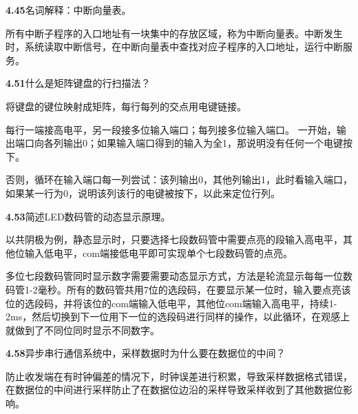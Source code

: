\documentclass{article}
\begin{document}
    \noindent\textbf{4.45}名词解释：中断向量表。\par
    所有中断子程序的入口地址有一块集中的存放区域，称为中断向量表。中断发生时，系统读取中断信号，在中断向量表中查找对应子程序的入口地址，运行中断服务。
    \\[4pt]\par

    \noindent\textbf{4.51}什么是矩阵键盘的行扫描法？\par
    将键盘的键位映射成矩阵，每行每列的交点用电键链接。\par
    每行一端接高电平，另一段接多位输入端口；每列接多位输入端口。
一开始，输出端口向各列输出0；如果输入端口得到的输入为全1，那说明没有任何一个电键按下。\par
    否则，循环在输入端口每一列尝试：该列输出0，其他列输出1，此时看输入端口，如果某一行为0，说明该列该行的电键被按下，以此来定位行列。
    \\[4pt]\par

    \noindent\textbf{4.53}简述LED数码管的动态显示原理。\par
    以共阴极为例，静态显示时，只要选择七段数码管中需要点亮的段输入高电平，其他位输入低电平，com端接低电平即可实现单个七段数码管的点亮。\par
多位七段数码管同时显示数字需要需要动态显示方式，方法是轮流显示每每一位数码管1-2毫秒。所有的数码管共用7位的选段码，在要显示某一位时，输入要点亮该位的选段码，并将该位的com端输入低电平，其他位com端输入高电平，持续1-2ms，然后切换到下一位用下一位的选段码进行同样的操作，以此循环，在观感上就做到了不同位同时显示不同数字。
    \\[4pt]\par

    \noindent\textbf{4.58}异步串行通信系统中，采样数据时为什么要在数据位的中间？\par
    防止收发端在有时钟偏差的情况下，时钟误差进行积累，导致采样数据格式错误，在数据位的中间进行采样防止了在数据位边沿的采样导致采样收到了其他数据位影响。
    \\[4pt]\par
\end{document}
